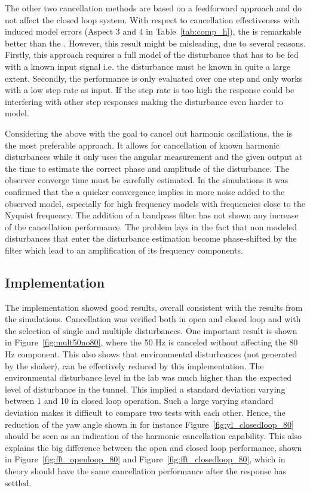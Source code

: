 The other two cancellation methods are based on a feedforward approach and do not affect the closed loop system. With respect to cancellation effectiveness with induced model errors (Aspect 3 and 4 in Table~\ref{tab:comp_h}), the \abbrFDC is remarkable better than the \abbrRFDC. However, this result might be misleading, due to several reasons. Firstly, this approach requires a full model of the disturbance that has to be fed with a known input signal i.e. the disturbance must be known in quite a large extent. Secondly, the \abbrFDC performance is only evaluated over one step and only works with a low step rate as input. If the step rate is too high the response could be interfering with other step responses making the disturbance even harder to model.

Considering the above with the goal to cancel out harmonic oscillations, the \abbrRFDC is the most preferable approach. It allows for cancellation of known harmonic disturbances while it only uses the angular measurement and the given output at the time to estimate the correct phase and amplitude of the disturbance. The observer converge time must be carefully estimated. In the simulations it was confirmed that the a quicker convergence implies in more noise added to the observed model, especially for high frequency models with frequencies close to the Nyquist frequency. The addition of a bandpass filter has not shown any increase of the cancellation performance. The problem lays in the fact that non modeled disturbances that enter the disturbance estimation become phase-shifted by the filter which lead to an amplification of its frequency components.

\subsection{Implementation}
The \abbrRFDC implementation showed good results, overall consistent with the results from the simulations. Cancellation was verified both in open and closed loop and with the selection of single and multiple disturbances. One important result is shown in Figure~\ref{fig:mult50no80}, where the 50 Hz is canceled without affecting the 80 Hz component. This also shows that environmental disturbances (not generated by the shaker), can be effectively reduced by this implementation. The environmental disturbance level in the lab was much higher than the expected level of disturbance in the tunnel. This implied a standard deviation varying between \unit{1}{\micro\radian} and \unit{10}{\micro\radian} in closed loop operation. Such a large varying standard deviation makes it difficult to compare two tests with each other. Hence, the reduction of the yaw angle shown in for instance Figure~\ref{fig:yl_closedloop_80} should be seen as an indication of the harmonic cancellation capability. This also explains the big difference between the open and closed loop performance, shown in Figure~\ref{fig:fft_openloop_80} and Figure~\ref{fig:fft_closedloop_80}, which in theory should have the same cancellation performance after the response has settled.

